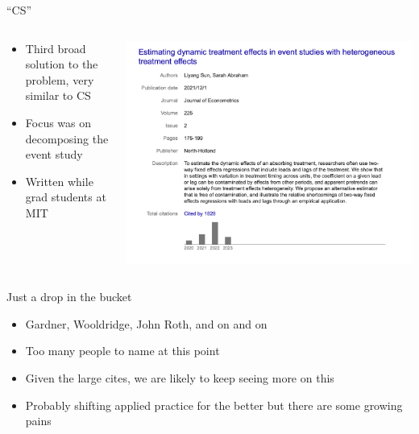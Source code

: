 \documentclass{beamer}
\begin{document}
\begin{frame}{``CS''}
  \begin{columns}
    \begin{column}{0.5\textwidth}
      \begin{itemize}
\item Third broad solution to the problem, very similar to CS
\item Focus was on decomposing the event study
\item Written while grad students at MIT
      \end{itemize}
    \end{column}
    \begin{column}{0.5\textwidth}
      \includegraphics[scale=0.25]{./lecture_includes/sun_cites}
    \end{column}
  \end{columns}
\end{frame}

\begin{frame}{Just a drop in the bucket}

\begin{itemize}
\item Gardner, Wooldridge, John Roth, and on and on
\item Too many people to name at this point
\item Given the large cites, we are likely to keep seeing more on this
\item Probably shifting applied practice for the better but there are some growing pains
\end{itemize}

\end{frame}
\end{document}

